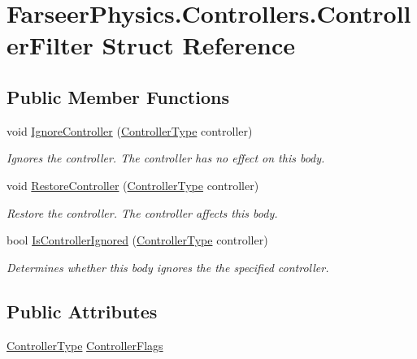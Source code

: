 \hypertarget{struct_farseer_physics_1_1_controllers_1_1_controller_filter}{\section{Farseer\+Physics.\+Controllers.\+Controller\+Filter Struct Reference}
\label{struct_farseer_physics_1_1_controllers_1_1_controller_filter}
}
\subsection*{Public Member Functions}
\begin{DoxyCompactItemize}
\item 
void \hyperlink{struct_farseer_physics_1_1_controllers_1_1_controller_filter_aff4f155b8efaeef8e6ca6ccf5ec82eba}{Ignore\+Controller} (\hyperlink{namespace_farseer_physics_1_1_controllers_a0b34b986191b1dd53a0a4169d1add7c7}{Controller\+Type} controller)
\begin{DoxyCompactList}\small\item\em Ignores the controller. The controller has no effect on this body. \end{DoxyCompactList}\item 
void \hyperlink{struct_farseer_physics_1_1_controllers_1_1_controller_filter_a93bd32e5bf9c6af888bcf0391389bf62}{Restore\+Controller} (\hyperlink{namespace_farseer_physics_1_1_controllers_a0b34b986191b1dd53a0a4169d1add7c7}{Controller\+Type} controller)
\begin{DoxyCompactList}\small\item\em Restore the controller. The controller affects this body. \end{DoxyCompactList}\item 
bool \hyperlink{struct_farseer_physics_1_1_controllers_1_1_controller_filter_a2590b1406cf0cd3e6fc0e021f1c47bff}{Is\+Controller\+Ignored} (\hyperlink{namespace_farseer_physics_1_1_controllers_a0b34b986191b1dd53a0a4169d1add7c7}{Controller\+Type} controller)
\begin{DoxyCompactList}\small\item\em Determines whether this body ignores the the specified controller. \end{DoxyCompactList}\end{DoxyCompactItemize}
\subsection*{Public Attributes}
\begin{DoxyCompactItemize}
\item 
\hyperlink{namespace_farseer_physics_1_1_controllers_a0b34b986191b1dd53a0a4169d1add7c7}{Controller\+Type} \hyperlink{struct_farseer_physics_1_1_controllers_1_1_controller_filter_a3ac8fe924f242b144af08d3037c96a47}{Controller\+Flags}
\end{DoxyCompactItemize}



